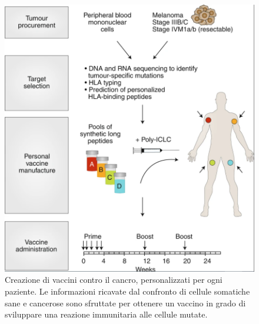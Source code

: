 \documentclass[11pt]{article}
\begin{document}
\begin{figure}[H]
	\centering
	\includegraphics[height=0.325\textheight]{vaccino_cancro}
	\caption{Creazione di vaccini contro il cancro, personalizzati per ogni paziente. Le informazioni ricavate dal confronto di cellule somatiche sane e cancerose sono sfruttate per ottenere un vaccino in grado di sviluppare una reazione immunitaria alle cellule mutate.\cite{scheetz2019engineering}}
	\label{fig:vaccinocancro}
\end{figure}

\newpage



\end{document}
